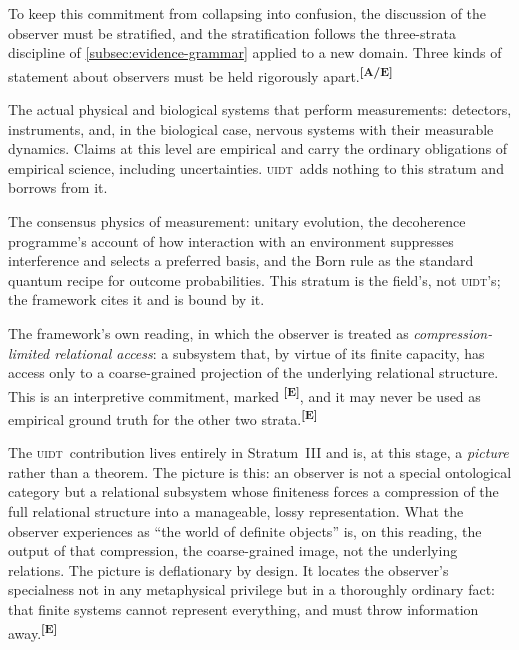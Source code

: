 \documentclass[12pt,a4paper,twoside]{article}
\theoremstyle{plain}
\theoremstyle{definition}
\theoremstyle{remark}
\newcommand{\UIDT}{\textsc{uidt}}
\newcommand{\catmark}[1]{\textsuperscript{\textsf{\textbf{[#1]}}}}
\begin{document}
To keep this commitment from collapsing into confusion, the discussion of the observer must be stratified, and the stratification follows the three-strata discipline of \cref{subsec:evidence-grammar} applied to a new domain. Three kinds of statement about observers must be held rigorously apart.\catmark{A/E}

\begin{description}[leftmargin=1.4em,style=nextline]
\item[Stratum~I: Empirical observer systems.] The actual physical and biological systems that perform measurements: detectors, instruments, and, in the biological case, nervous systems with their measurable dynamics. Claims at this level are empirical and carry the ordinary obligations of empirical science, including uncertainties. \UIDT\ adds nothing to this stratum and borrows from it. \item[Stratum~II: Standard quantum and decoherence formalism.] The consensus physics of measurement: unitary evolution, the decoherence programme's account of how interaction with an environment suppresses interference and selects a preferred basis, and the Born rule as the standard quantum recipe for outcome probabilities. This stratum is the field's, not \UIDT's; the framework cites it and is bound by it. \item[Stratum~III: The \UIDT\ interpretation.] The framework's own reading, in which the observer is treated as \emph{compression-limited relational access}: a subsystem that, by virtue of its finite capacity, has access only to a coarse-grained projection of the underlying relational structure. This is an interpretive commitment, marked \catmark{E}, and it may never be used as empirical ground truth for the other two strata.\catmark{E}
\end{description}

\noindent The \UIDT\ contribution lives entirely in Stratum~III and is, at this stage, a \emph{picture} rather than a theorem. The picture is this: an observer is not a special ontological category but a relational subsystem whose finiteness forces a compression of the full relational structure into a manageable, lossy representation. What the observer experiences as ``the world of definite objects'' is, on this reading, the output of that compression, the coarse-grained image, not the underlying relations. The picture is deflationary by design. It locates the observer's specialness not in any metaphysical privilege but in a thoroughly ordinary fact: that finite systems cannot represent everything, and must throw information away.\catmark{E}
\end{document}
